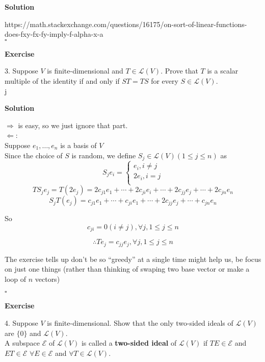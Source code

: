 \documentclass{article}
\newenvironment{exercise}{%
{\textbf{Exercise\\}
    }
}{
}
\newenvironment{solution}{%
{
    \textbf{Solution\\}
    }
}{
  \hfill $\square$ 
  \par\bigskip 
}
\begin{document}
\begin{CJK}{UTF8}{gkai}
\begin{solution}
https://math.stackexchange.com/questions/16175/on-sort-of-linear-functions-does-fxy-fx-fy-imply-f-alpha-x-a\\
\end{solution}

\begin{exercise}
3. Suppose $V$ is finite-dimensional and $T \in \mathcal{L}(V)$. Prove that $T$ is a scalar multiple of the identity if and only if $ST = TS$ for every $S \in \mathcal{L}(V)$.\\
\end{exercise}j

\begin{solution}
$\Rightarrow$ is easy, so we just ignore that part.\\

$\Leftarrow$:\\

Suppose $e_1,\ldots , e_n$ is a basis of $V$\\

Since the choice of $S$ is random, we define $S_{j} \in \mathcal{L}(V) ( 1\leq j \leq n )$ as
\[S_j e_i = 
\begin{cases}
    e_i, i\neq j\\
    2e_i, i = j\\
\end{cases}
\]
\[  
    TS_{j}e_j= T(2e_j) = 2c_{j1} e_1 +\cdots + 2c_{ji} e_i + \cdots + 2c_{jj} e_j+  \cdots + 2c_{jn} e_n
\]
\[
    S_{j}T(e_j)=c_{j1} e_1 +\cdots + c_{ji} e_1 + \cdots + 2c_{jj} e_j + \cdots + c_{jn} e_n
\]

So \[c_{ji} = 0 (i \neq j) , \forall j , 1\leq j \leq n\]

\[\therefore T e_j = c_{jj} e_j ,\forall j, 1\leq j \leq n\]

The exercise tells up don't be so ``greedy'' at a single time might help us, be focus on just one things (rather than thinking of swaping two base vector or make a loop of $n$ vectors)
\end{solution}

\begin{exercise}
4. Suppose $V$ is finite-dimensional. Show that the only two-sided ideals of $\mathcal{L}(V)$ are $\{0\}$ and $\mathcal{L}(V)$.\\

A subspace $\mathcal{E}$  of $\mathcal{L}(V)$ is called a \textbf{two-sided ideal} of $\mathcal{L}(V)$ if $TE \in \mathcal{E}$  and
$ET \in\mathcal{E}$ $\forall E \in \mathcal{E}$ and $\forall T \in \mathcal{L}(V)$.\\


\end{exercise}
\end{CJK}
\end{document}
